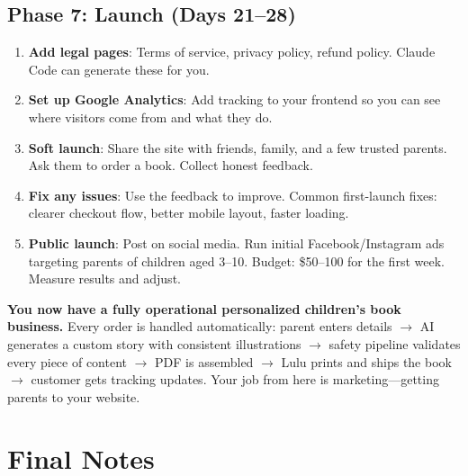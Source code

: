 \documentclass[12pt, letterpaper, oneside]{book}
\begin{document}
\section{Phase 7: Launch (Days 21--28)}

\begin{enumerate}[leftmargin=2em, itemsep=6pt, start=27]
  \item \textbf{Add legal pages}: Terms of service, privacy policy, refund policy. Claude Code can generate these for you.

  \item \textbf{Set up Google Analytics}: Add tracking to your frontend so you can see where visitors come from and what they do.

  \item \textbf{Soft launch}: Share the site with friends, family, and a few trusted parents. Ask them to order a book. Collect honest feedback.

  \item \textbf{Fix any issues}: Use the feedback to improve. Common first-launch fixes: clearer checkout flow, better mobile layout, faster loading.

  \item \textbf{Public launch}: Post on social media. Run initial Facebook/Instagram ads targeting parents of children aged 3--10. Budget: \$50--100 for the first week. Measure results and adjust.
\end{enumerate}

\begin{successbox}
\textbf{You now have a fully operational personalized children's book business.} Every order is handled automatically: parent enters details $\rightarrow$ AI generates a custom story with consistent illustrations $\rightarrow$ safety pipeline validates every piece of content $\rightarrow$ PDF is assembled $\rightarrow$ Lulu prints and ships the book $\rightarrow$ customer gets tracking updates. Your job from here is marketing---getting parents to your website.
\end{successbox}


\chapter*{Final Notes}
\end{document}
